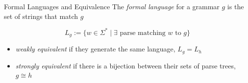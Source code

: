 \documentclass[10pt]{beamer}
\begin{document}
\begin{frame}{Formal Languages and Equivalence}
  The \emph{formal language} for a grammar $g$ is the set of strings that match $g$

  \[
    L_{g} := \{ w \in \Sigma^{*} \mid \exists \text{ parse matching } w \text{ to } g\}
  \]

  \begin{itemize}
    \item<3-> \emph{weakly equivalent} if they generate the same language, $L_{g} = L_{h}$
    \item<3-> \emph{strongly equivalent} if there is a bijection between their sets of parse trees, $g \cong h$
  \end{itemize}

\end{frame}
\end{document}
